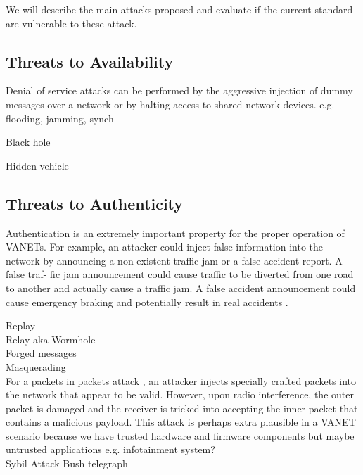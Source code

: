 \documentclass[conference]{IEEEtran}
\begin{document}
We will describe the main attacks proposed and evaluate if the current standard are vulnerable to these attack. 

\subsection{Threats to Availability}

Denial of service attacks can be performed by the aggressive injection of dummy messages over a network or by halting access to shared network devices. e.g. flooding, jamming, synch \cite{biswas2012ddos}

Black hole \cite{laurendeau2006threats} 

Hidden vehicle \cite{raya2007securing}

\subsection{Threats to Authenticity}


Authentication is an extremely important property for the proper operation of VANETs. For example, an attacker could
inject false information into the network by announcing a non-existent traffic jam or a false accident report. A false traf- fic jam announcement could cause traffic to be diverted from one road to another and actually cause a traffic jam. A false accident announcement could cause emergency braking and potentially result in real accidents \cite{toor2008vehicle}.


Replay\\
Relay aka Wormhole \cite{raya2007securing} \\
Forged messages\\
Masquerading \cite{laurendeau2006threats}\\

For a packets in packets attack \cite{goodspeed2011packets}, an attacker injects specially crafted packets into the network that appear to be valid. However, upon radio interference, the outer packet is damaged and the receiver is tricked into accepting the inner packet that contains a malicious payload. This attack is perhaps extra plausible in a VANET scenario because we have trusted hardware and firmware components but maybe untrusted applications e.g. infotainment system?\\

Sybil Attack \cite{zhou2007privacy}
Bush telegraph \cite{raya2007securing}\\
\end{document}
